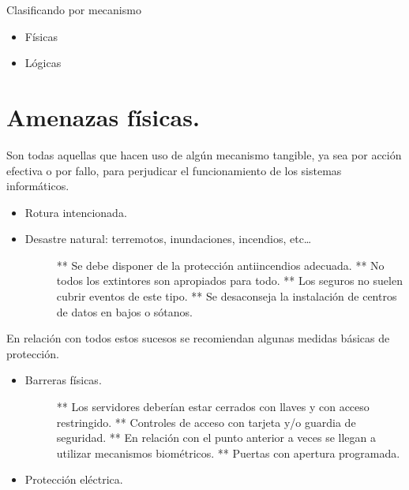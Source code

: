 \documentclass[letterpaper,10pt,spanish]{sphinxmanual}
\begin{document}
Clasificando por mecanismo
\begin{itemize}
\item {} 
Físicas

\item {} 
Lógicas

\end{itemize}


\section{Amenazas físicas.}
\label{\detokenize{tema_pautas_seguridad_informatica/tema_pautas_seguridad_informatica:amenazas-fisicas}}
Son todas aquellas que hacen uso de algún mecanismo tangible, ya sea por acción efectiva o por fallo, para perjudicar el funcionamiento de los sistemas informáticos.
\begin{itemize}
\item {} 
Rotura intencionada.

\item {} \begin{description}
\item[{Desastre natural: terremotos, inundaciones, incendios, etc…}] \leavevmode
** Se debe disponer de la protección antiincendios adecuada.
** No todos los extintores son apropiados para todo.
** Los seguros no suelen cubrir eventos de este tipo.
** Se desaconseja la instalación de centros de datos en bajos o sótanos.

\end{description}

\end{itemize}

En relación con todos estos sucesos se recomiendan algunas medidas básicas de protección.
\begin{itemize}
\item {} \begin{description}
\item[{Barreras físicas.}] \leavevmode
** Los servidores deberían estar cerrados con llaves y con acceso restringido.
** Controles de acceso con tarjeta y/o guardia de seguridad.
** En relación con el punto anterior a veces se llegan a utilizar mecanismos biométricos.
** Puertas con apertura programada.

\end{description}

\item {} 
Protección eléctrica.

\end{itemize}
\end{document}
